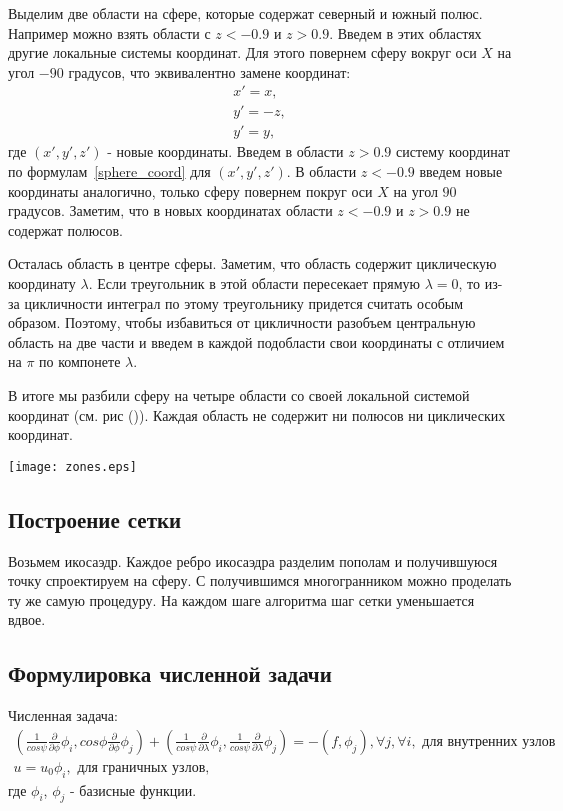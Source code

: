 \documentclass[a4paper,article]{article}
\begin{document}
\begin{eqaution*}
Выделим две области на сфере, которые содержат северный и южный
полюс. Например можно взять области с $z<-0.9$ и $z>0.9$. Введем в
этих областях другие локальные системы координат. Для этого повернем сферу
вокруг оси $X$ на угол $-90$ градусов, что эквивалентно замене координат:
\begin{equation*}
\begin{split}
x' = x,\\
y' = -z,\\
y' = y,
\end{split}
\end{equation*}
где $(x',y',z')$ - новые координаты. Введем в области $z>0.9$ систему
координат по формулам~\ref{sphere_coord} для $(x',y',z')$.
В области $z<-0.9$ введем новые координаты аналогично, только сферу
повернем покруг оси $X$ на угол $90$ градусов.
Заметим, что в новых координатах области $z<-0.9$ и $z>0.9$ не
содержат полюсов.

Осталась область в центре сферы. Заметим, что область содержит
циклическую координату $\lambda$. Если треугольник в этой области
пересекает прямую $\lambda=0$, то из-за цикличности интеграл по этому
треугольнику придется считать особым образом. Поэтому, чтобы
избавиться от цикличности разобъем центральную область на две части и
введем в каждой подобласти свои координаты с отличием на $\pi$ по
компонете $\lambda$.

В итоге мы разбили сферу на четыре области со своей локальной системой
координат (см. рис ()). Каждая область не содержит ни полюсов ни
циклических координат.

\begin{center}
\texttt{[image: zones.eps]}
\end{center} 

\subsection*{Построение сетки}
Возьмем икосаэдр. Каждое ребро икосаэдра разделим пополам и
получившуюся точку спроектируем на сферу. С получившимся
многогранником можно проделать ту же самую процедуру. На каждом шаге
алгоритма шаг сетки уменьшается вдвое. 

\subsection*{Формулировка численной задачи}
Численная задача:
\begin{equation*}
\begin{split}
(\frac{1}{cos\psi}\frac{\partial}{\partial \phi} \phi_i, cos\phi
  \frac{\partial}{\partial \phi} \phi_j) 
+(\frac{1}{cos\psi}\frac{\partial}{\partial \lambda}\phi_i,
\frac{1}{cos\psi}\frac{\partial}{\partial \lambda}\phi_j ) = -(f,
\phi_j), \forall j, \forall i, \text{ для внутренних узлов } \\ 
u = u_0 \phi_i, \text { для граничных узлов, }
\end{split}
\end{equation*}
где $\phi_i$, $\phi_j$ - базисные функции.


\end{eqaution*}
\end{document}
